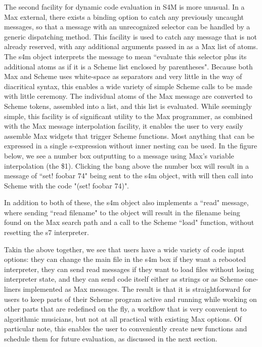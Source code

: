 \documentclass[acmsmall]{acmart}
\begin{document}
The second facility for dynamic code evaluation in S4M is more unusual.
In a Max external, there exists a binding option to catch any previously
uncaught messages, so that a message with an unrecognized selector 
can be handled by a generic dispatching method. This facility is used to 
catch any message that is not already reserved, with any additional 
arguments passed in as a Max list of atoms.  The s4m object interprets
the message to mean ``evaluate this selector plus its additional atoms 
as if it is a Scheme list enclosed by parentheses".
Because both Max and Scheme uses white-space as separators and very little
in the way of diacritical syntax, this enables a wide variety
of simple Scheme calls to be made with little ceremony. The
individual atoms of the Max message are converted to Scheme tokens,
assembled into a list, and this list is evaluated. While seemingly simple,
this facility is of significant utility to the Max programmer, as combined
with the Max message interpolation facility, it enables the user to very
easily assemble Max widgets that trigger Scheme functions. Most anything that
can be expressed in a single s-expression without inner nesting can be used.
In the figure below,
we see a number box outputting to a message using Max's variable interpolation
(the \$1). Clicking the bang above the number box will result in a message of 
``set! foobar 74" being sent to the s4m object, with will then call
into Scheme with the code "(set! foobar 74)".


In addition to both of these, the s4m object also implements a ``read" message,
where sending ``read {filename}" to the object will result in the filename
being found on the Max search path and a call to the Scheme ``load" function,
without resetting the s7 interpreter.

Takin the above together, we see that users have a wide variety of code input options:
they can change the main file in the s4m box if they want a rebooted interpreter,
they can send read messages if they want to load files without losing 
interpreter state, and they can send code itself either as strings or as Scheme
one-liners implemented as Max messages. The result is that it is straightforward
for users to keep parts of their Scheme program active and running
while working on other parts that are redefined on the fly, a workflow that is
very convenient to algorithmic musicians, but not at all practical with existing
Max options. Of particular note, this enables the user to
conveniently create new functions and schedule them for future evaluation,
as discussed in the next section.
\end{document}
